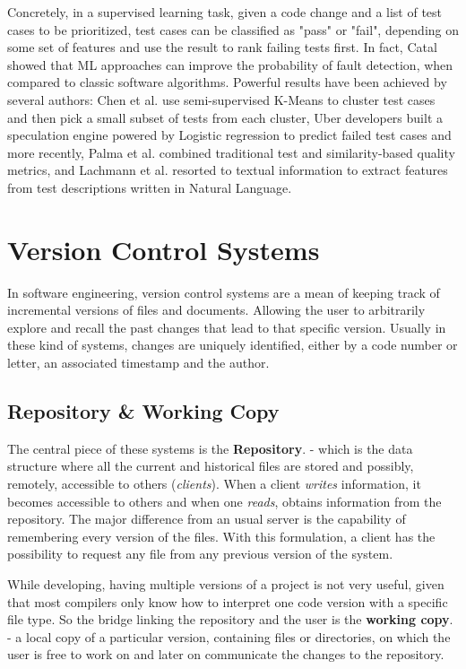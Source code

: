 \par Concretely, in a supervised learning task, given a code change and a list of test cases to be prioritized, test cases can be classified as "pass" or "fail", depending on some set of features and use the result to rank failing tests first.
In fact, Catal \cite{catal} showed that ML approaches can improve the probability of fault detection, when compared to classic software algorithms. 
Powerful results have been achieved by several authors: Chen et al. \cite{chen} use semi-supervised K-Means to cluster test cases and then pick a small subset of tests from each cluster, Uber developers \cite{Uber} built a speculation engine powered by Logistic regression to predict failed test cases and more recently, Palma et al. \cite{palma} combined traditional test and similarity-based quality metrics, and Lachmann et al. \cite{lachmannlp} resorted to textual information to extract features from test descriptions written in Natural Language.


\section{Version Control Systems}

In software engineering, version control systems are a mean of keeping track of incremental versions of files and documents. Allowing the user to arbitrarily explore and recall the past changes that lead to that specific version. Usually in these kind of systems, changes are uniquely identified, either by a code number or letter, an associated timestamp and the author.\cite{santolucito2018statically} 


\subsection{Repository \& Working Copy}

The central piece of these systems is the \textbf{Repository}. - which is the data structure where all the current and historical files are stored and possibly, remotely, accessible to others (\textit{clients}).\cite{santolucito2018statically} When a client \textit{writes} information, it becomes accessible to others and when one \textit{reads}, obtains information from the repository. The major difference from an usual server is the capability of remembering every version of the files. With this formulation, a client has the possibility to request any file from any previous version of the system.
\par While developing, having multiple versions of a project is not very useful, given that most compilers only know how to interpret one code version with a specific file type. So the bridge linking the repository and the user is the \textbf{working copy}. - a local copy of a particular version, containing files or directories, on which the user is free to work on and later on communicate the changes to the repository.\cite{santolucito2018statically}

